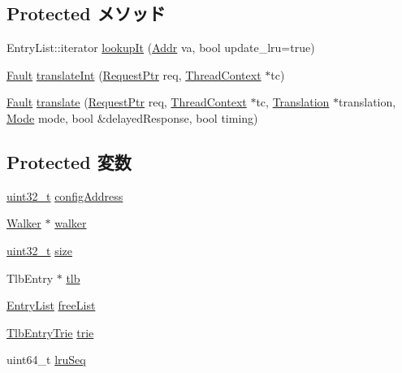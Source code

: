 \subsection*{Protected メソッド}
\begin{DoxyCompactItemize}
\item 
EntryList::iterator \hyperlink{classX86ISA_1_1TLB_ae73955fcefd34a6fab596ade6c99290f}{lookupIt} (\hyperlink{base_2types_8hh_af1bb03d6a4ee096394a6749f0a169232}{Addr} va, bool update\_\-lru=true)
\item 
\hyperlink{classRefCountingPtr}{Fault} \hyperlink{classX86ISA_1_1TLB_ad195b09fbba19be819ba87ce931fc31d}{translateInt} (\hyperlink{classRequest}{RequestPtr} req, \hyperlink{classThreadContext}{ThreadContext} $\ast$tc)
\item 
\hyperlink{classRefCountingPtr}{Fault} \hyperlink{classX86ISA_1_1TLB_a8b22251fd759b80bb032b04e7f2fc68a}{translate} (\hyperlink{classRequest}{RequestPtr} req, \hyperlink{classThreadContext}{ThreadContext} $\ast$tc, \hyperlink{classBaseTLB_1_1Translation}{Translation} $\ast$translation, \hyperlink{classBaseTLB_a46c8a310cf4c094f8c80e1cb8dc1f911}{Mode} mode, bool \&delayedResponse, bool timing)
\end{DoxyCompactItemize}
\subsection*{Protected 変数}
\begin{DoxyCompactItemize}
\item 
\hyperlink{Type_8hh_a435d1572bf3f880d55459d9805097f62}{uint32\_\-t} \hyperlink{classX86ISA_1_1TLB_a2c2064456d968624c149f8658bcfee32}{configAddress}
\item 
\hyperlink{classX86ISA_1_1Walker}{Walker} $\ast$ \hyperlink{classX86ISA_1_1TLB_a54537e5fcbe2d6f609ca4c90a48a06a8}{walker}
\item 
\hyperlink{Type_8hh_a435d1572bf3f880d55459d9805097f62}{uint32\_\-t} \hyperlink{classX86ISA_1_1TLB_ab2c6b258f02add8fdf4cfc7c371dd772}{size}
\item 
TlbEntry $\ast$ \hyperlink{classX86ISA_1_1TLB_a4651b9a4f432960d77d8e3d30175aab3}{tlb}
\item 
\hyperlink{classstd_1_1list}{EntryList} \hyperlink{classX86ISA_1_1TLB_a7c13435dc688d8e4d7600964147b5705}{freeList}
\item 
\hyperlink{classTrie}{TlbEntryTrie} \hyperlink{classX86ISA_1_1TLB_aac73611ce3ddb38006a5c03e6ba91977}{trie}
\item 
uint64\_\-t \hyperlink{classX86ISA_1_1TLB_a5bea8f11255089115ad43ef4d83e7c7f}{lruSeq}
\end{DoxyCompactItemize}
